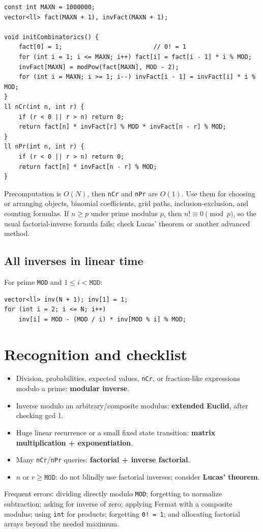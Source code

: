 \begin{lstlisting}
const int MAXN = 1000000;
vector<ll> fact(MAXN + 1), invFact(MAXN + 1);

void initCombinatorics() {
    fact[0] = 1;                         // 0! = 1
    for (int i = 1; i <= MAXN; i++) fact[i] = fact[i - 1] * i % MOD;
    invFact[MAXN] = modPow(fact[MAXN], MOD - 2);
    for (int i = MAXN; i >= 1; i--) invFact[i - 1] = invFact[i] * i % MOD;
}
ll nCr(int n, int r) {
    if (r < 0 || r > n) return 0;
    return fact[n] * invFact[r] % MOD * invFact[n - r] % MOD;
}
ll nPr(int n, int r) {
    if (r < 0 || r > n) return 0;
    return fact[n] * invFact[n - r] % MOD;
}
\end{lstlisting}

Precomputation is $O(N)$, then \texttt{nCr} and \texttt{nPr} are $O(1)$. Use them for choosing or arranging objects, binomial coefficients, grid paths, inclusion-exclusion, and counting formulas. If $n \geq p$ under prime modulus $p$, then $n! \equiv 0 \pmod p$, so the usual factorial-inverse formula fails; check Lucas' theorem or another advanced method.

\subsection{All inverses in linear time}
For prime \texttt{MOD} and $1 \leq i < \texttt{MOD}$:
\begin{lstlisting}
vector<ll> inv(N + 1); inv[1] = 1;
for (int i = 2; i <= N; i++)
    inv[i] = MOD - (MOD / i) * inv[MOD % i] % MOD;
\end{lstlisting}

\section{Recognition and checklist}
\begin{itemize}
\item Division, probabilities, expected values, \texttt{nCr}, or fraction-like expressions modulo a prime: \textbf{modular inverse}.
\item Inverse modulo an arbitrary/composite modulus: \textbf{extended Euclid}, after checking gcd 1.
\item Huge linear recurrence or a small fixed state transition: \textbf{matrix multiplication + exponentiation}.
\item Many \texttt{nCr}/\texttt{nPr} queries: \textbf{factorial + inverse factorial}.
\item $n$ or $r \geq \texttt{MOD}$: do not blindly use factorial inverses; consider \textbf{Lucas' theorem}.
\end{itemize}

Frequent errors: dividing directly modulo \texttt{MOD}; forgetting to normalize subtraction; asking for inverse of zero; applying Fermat with a composite modulus; using \texttt{int} for products; forgetting \texttt{0! = 1}; and allocating factorial arrays beyond the needed maximum.
